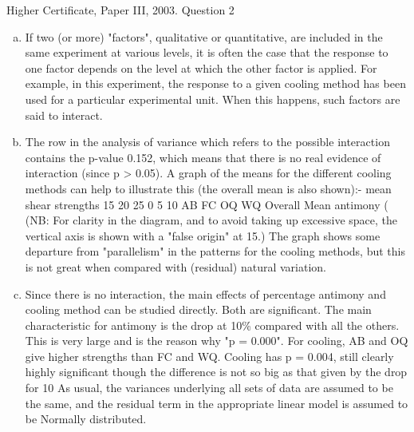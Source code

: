 \documentclass[a4paper,12pt]{article}
\begin{document}
Higher Certificate, Paper III, 2003. Question 2
\begin{enumerate}[(a)]
\item  If two (or more) "factors", qualitative or quantitative, are included in the same
experiment at various levels, it is often the case that the response to one factor
depends on the level at which the other factor is applied. For example, in this
experiment, the response to a given %
cooling method has been used for a particular experimental unit. When this happens,
such factors are said to interact.
\item The row in the analysis of variance which refers to the possible interaction
contains the p-value 0.152, which means that there is no real evidence of interaction
(since p > 0.05). A graph of the means for the different cooling methods can help to
illustrate this (the overall mean is also shown):-
mean shear strengths
15
20
25
0 5 10
AB
FC
OQ
WQ
Overall Mean
antimony (%
(NB: For clarity in the diagram, and to avoid taking up excessive space, the vertical axis is shown with a
"false origin" at 15.)
The graph shows some departure from "parallelism" in the patterns for the cooling
methods, but this is not great when compared with (residual) natural variation.
\item Since there is no interaction, the main effects of percentage antimony and cooling
method can be studied directly. Both are significant. The main characteristic for %
antimony is the drop at 10\% compared with all the others. This is very large and is
the reason why "p = 0.000". For cooling, AB and OQ give higher strengths than FC
and WQ. Cooling has p = 0.004, still clearly highly significant though the difference
is not so big as that given by the drop for 10%
As usual, the variances underlying all sets of data are assumed to be the same, and the
residual term in the appropriate linear model is assumed to be Normally distributed.
\end{enumerate}
\end{document}
